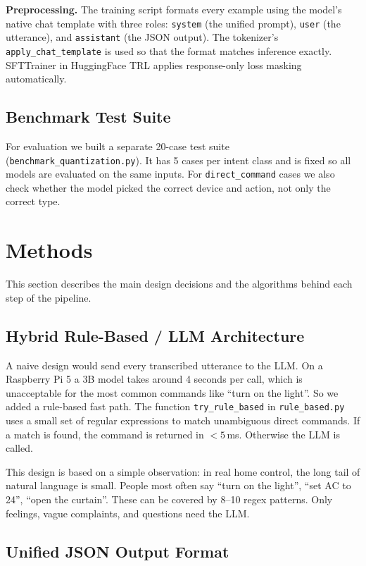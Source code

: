 \documentclass[conference]{IEEEtran}
\begin{document}
\textbf{Preprocessing.} The training script formats every example using the model's native chat template with three roles: \texttt{system} (the unified prompt), \texttt{user} (the utterance), and \texttt{assistant} (the JSON output). The tokenizer's \texttt{apply\_chat\_template} is used so that the format matches inference exactly. SFTTrainer in HuggingFace TRL applies response-only loss masking automatically.

\subsection{Benchmark Test Suite}

For evaluation we built a separate 20-case test suite (\texttt{benchmark\_quantization.py}). It has 5 cases per intent class and is fixed so all models are evaluated on the same inputs. For \texttt{direct\_command} cases we also check whether the model picked the correct device and action, not only the correct type.

\section{Methods}
\label{sec:methods}

This section describes the main design decisions and the algorithms behind each step of the pipeline.

\subsection{Hybrid Rule-Based / LLM Architecture}

A naive design would send every transcribed utterance to the LLM. On a Raspberry Pi 5 a 3B model takes around 4 seconds per call, which is unacceptable for the most common commands like ``turn on the light''. So we added a rule-based fast path. The function \texttt{try\_rule\_based} in \texttt{rule\_based.py} uses a small set of regular expressions to match unambiguous direct commands. If a match is found, the command is returned in $<5$\,ms. Otherwise the LLM is called.

This design is based on a simple observation: in real home control, the long tail of natural language is small. People most often say ``turn on the light'', ``set AC to 24'', ``open the curtain''. These can be covered by 8--10 regex patterns. Only feelings, vague complaints, and questions need the LLM.

\subsection{Unified JSON Output Format}
\end{document}
